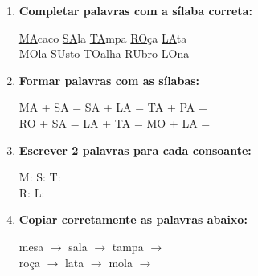 \begin{exercicio}
\begin{enumerate}[resume]
  \item \textbf{Completar palavras com a sílaba correta:}
  \begin{center}
  \underline{MA}caco \quad \underline{SA}la \quad \underline{TA}mpa \quad \underline{RO}ça \quad \underline{LA}ta \\
  \underline{MO}la \quad \underline{SU}sto \quad \underline{TO}alha \quad \underline{RU}bro \quad \underline{LO}na
  \end{center}

  \item \textbf{Formar palavras com as sílabas:}
  \begin{center}
  MA + SA = \underline{\hspace{2cm}} \quad SA + LA = \underline{\hspace{2cm}} \quad TA + PA = \underline{\hspace{2cm}} \\
  RO + SA = \underline{\hspace{2cm}} \quad LA + TA = \underline{\hspace{2cm}} \quad MO + LA = \underline{\hspace{2cm}}
  \end{center}

  \item \textbf{Escrever 2 palavras para cada consoante:}
  \begin{center}
  M: \underline{\hspace{3cm}} \underline{\hspace{3cm}} \quad S: \underline{\hspace{3cm}} \underline{\hspace{3cm}} \quad T: \underline{\hspace{3cm}} \underline{\hspace{3cm}} \\
  R: \underline{\hspace{3cm}} \underline{\hspace{3cm}} \quad L: \underline{\hspace{3cm}} \underline{\hspace{3cm}}
  \end{center}

  \item \textbf{Copiar corretamente as palavras abaixo:}
  \begin{center}
  mesa $\rightarrow$ \underline{\hspace{3cm}} \quad sala $\rightarrow$ \underline{\hspace{3cm}} \quad tampa $\rightarrow$ \underline{\hspace{3cm}} \\
  roça $\rightarrow$ \underline{\hspace{3cm}} \quad lata $\rightarrow$ \underline{\hspace{3cm}} \quad mola $\rightarrow$ \underline{\hspace{3cm}}
  \end{center}
\end{enumerate}


\end{exercicio}
